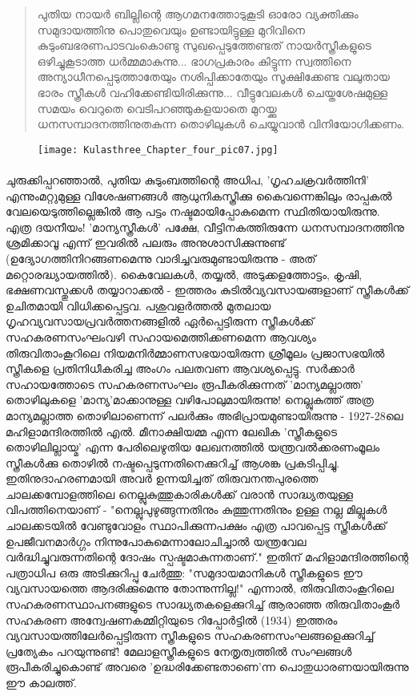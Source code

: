 \begin{quotation}
\noindent
പുതിയ  നായർ ബില്ലിന്റെ ആഗമനത്തോടുകൂടി ഓരോ വ്യക്തിക്കും സമുദായത്തിനു പൊതുവെയും ഉണ്ടായിട്ടുള്ള മുറിവിനെ കുടുംബഭരണപാടവംകൊണ്ടു സുഖപ്പെടുത്തേണ്ടത് നായർസ്ത്രീകളുടെ ഒഴിച്ചുകൂടാത്ത ധർമ്മമാകുന്നു...
ഭാഗപ്രകാരം കിട്ടുന്ന സ്വത്തിനെ അന്യാധീനപ്പെടുത്താതേയും നശിപ്പിക്കാതേയും സൂക്ഷിക്കേണ്ട വലുതായ ഭാരം സ്ത്രീകൾ വഹിക്കേണ്ടിയിരിക്കുന്നു... വീട്ടുവേലകൾ ചെയ്തശേഷമുള്ള സമയം വെറുതെ വെടിപറഞ്ഞുകളയാതെ മുറയ്ക്കു ധനസമ്പാദനത്തിനുതകുന്ന തൊഴിലുകൾ ചെയ്യുവാൻ വിനിയോഗിക്കണം.
\end{quotation}

\begin{figure}[h]
\begin{center}
\texttt{[image: Kulasthree\_Chapter\_four\_pic07.jpg]}
\end{center}
\end{figure}


\paragraph{}ചുരുക്കിപ്പറഞ്ഞാൽ, പുതിയ കുടുംബത്തിന്റെ അധിപ, 'ഗൃഹചക്രവർത്തിനി' എന്നുംമറ്റുമുള്ള വിശേഷണങ്ങൾ ആധുനികസ്ത്രീക്കു കൈവന്നെങ്കിലും രാപ്പകൽ വേലയെടുത്തില്ലെങ്കിൽ ആ പട്ടം നഷ്ടമായിപ്പോകുമെന്ന സ്ഥിതിയായിരുന്നു. എത്ര ദയനീയം! 'മാന്യസ്ത്രീകൾ' പക്ഷേ, വീട്ടിനകത്തിരുന്നേ ധനസമ്പാദനത്തിനു ശ്രമിക്കാവൂ എന്ന് ഇവരിൽ പലരും അനുശാസിക്കുന്നുണ്ട് (ഉദ്യോഗത്തിനിറങ്ങണമെന്നു വാദിച്ചവരുമുണ്ടായിരുന്നു - അത് മറ്റൊരദ്ധ്യായത്തിൽ). കൈവേലകൾ, തയ്യൽ, അടുക്കളത്തോട്ടം, കൃഷി, ഭക്ഷണവസ്തുക്കൾ തയ്യാറാക്കൽ - ഇത്തരം കുടിൽവ്യവസായങ്ങളാണ് സ്ത്രീകൾക്ക് ഉചിതമായി വിധിക്കപ്പെട്ടവ. പശുവളർത്തൽ മുതലായ ഗൃഹവ്യവസായപ്രവർത്തനങ്ങളിൽ ഏർപ്പെട്ടിരുന്ന സ്ത്രീകൾക്ക് സഹകരണസംഘംവഴി സഹായമെത്തിക്കണമെന്ന ആവശ്യം തിരുവിതാംകൂറിലെ നിയമനിർമ്മാണസഭയായിരുന്ന ശ്രീമൂലം പ്രജാസഭയിൽ സ്ത്രീകളെ പ്രതിനിധീകരിച്ച അംഗം പലതവണ ആവശ്യപ്പെട്ടു. സർക്കാർ സഹായത്തോടെ സഹകരണസംഘം രൂപീകരിക്കുന്നത് 'മാന്യമല്ലാത്ത' തൊഴിലുകളെ 'മാന്യ'മാക്കാനുള്ള വഴിപോലുമായിരുന്നു! നെല്ലുകുത്ത് അത്ര മാന്യമല്ലാത്ത തൊഴിലാണെന്ന് പലർക്കും അഭിപ്രായമുണ്ടായിരുന്നു - 1927-28ലെ മഹിളാമന്ദിരത്തിൽ എൽ. മീനാക്ഷിയമ്മ എന്ന ലേഖിക 'സ്ത്രീകളുടെ തൊഴിലില്ലായ്മ' എന്ന പേരിലെഴുതിയ ലേഖനത്തിൽ യന്ത്രവൽക്കരണംമൂലം സ്ത്രീകൾക്കു തൊഴിൽ നഷ്ടപ്പെടുന്നതിനെക്കുറിച്ച് ആശങ്ക പ്രകടിപ്പിച്ചു. ഇതിനുദാഹരണമായി അവർ ഉന്നയിച്ചത് തിരുവനന്തപുരത്തെ ചാലക്കമ്പോളത്തിലെ നെല്ലുകുത്തുകാരികൾക്ക് വരാൻ സാദ്ധ്യതയുള്ള വിപത്തിനെയാണ് - "നെല്ലുപുഴുങ്ങുന്നതിനും കുത്തുന്നതിനും ഉള്ള നല്ല മില്ലുകൾ ചാലക്കടയിൽ വേണ്ടുവോളം സ്ഥാപിക്കുന്നപക്ഷം എത്ര പാവപ്പെട്ട സ്ത്രീകൾക്ക് ഉപജീവനമാർഗ്ഗം നിന്നുപോകുമെന്നാലോചിച്ചാൽ യന്ത്രവേല വർദ്ധിച്ചുവരുന്നതിന്റെ ദോഷം സ്പഷ്ടമാകുന്നതാണ്." ഇതിന് മഹിളാമന്ദിരത്തിന്റെ പത്രാധിപ ഒരു അടിക്കുറിപ്പു ചേർത്തു: "സമുദായമാനികൾ സ്ത്രീകളുടെ ഈ വ്യവസായത്തെ ആദരിക്കുമെന്നു തോന്നുന്നില്ല!" എന്നാൽ, തിരുവിതാംകൂറിലെ സഹകരണസ്ഥാപനങ്ങളുടെ സാദ്ധ്യതകളെക്കുറിച്ച് ആരാഞ്ഞ തിരുവിതാംകൂർ സഹകരണ അന്വേഷണകമ്മിറ്റിയുടെ റിപ്പോർട്ടിൽ (1934) ഇത്തരം വ്യവസായത്തിലേർപ്പെട്ടിരുന്ന സ്ത്രീകളുടെ സഹകരണസംഘങ്ങളെക്കുറിച്ച് പ്രത്യേകം പറയുന്നുണ്ട്! മേലാളസ്ത്രീകളുടെ നേതൃത്വത്തിൽ സംഘങ്ങൾ രൂപീകരിച്ചുകൊണ്ട് അവരെ 'ഉദ്ധരിക്കേണ്ടതാണെ'ന്ന പൊതുധാരണയായിരുന്നു ഈ കാലത്ത്.

